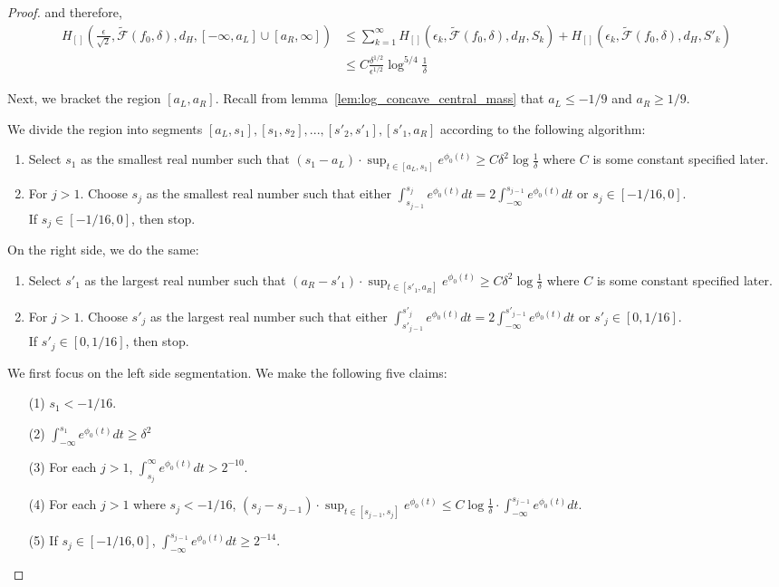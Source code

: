 \documentclass[12pt]{article}
\begin{document}
\begin{proof}
  
  and therefore,
  \begin{align}
    H_{[]}(\frac{\epsilon}{\sqrt{2}}, \tilde{\mathcal{F}}(f_0, \delta), d_H, [-\infty, a_L] \cup [a_R, \infty] )
    &\leq  \sum_{k=1}^\infty
    H_{[]}(\epsilon_k, \tilde{\mathcal{F}}(f_0, \delta), d_H, S_k) +
    H_{[]}(\epsilon_k, \tilde{\mathcal{F}}(f_0, \delta), d_H, S'_k) \\
    & \leq C \frac{\delta^{1/2}}{\epsilon^{1/2}} \log^{5/4} \frac{1}{\delta}
  \end{align}
    
  Next, we bracket the region $[a_L, a_R]$. Recall from lemma~\ref{lem:log_concave_central_mass} that $a_L \leq -1/9$ and $a_R \geq 1/9$. 

  We divide the region into segments $[a_L, s_1], [s_1, s_2], ..., [s'_2, s'_1], [s'_1, a_R]$ according to the following algorithm:
  \begin{enumerate}
  \item Select $s_1$ as the smallest real number such that $(s_1 - a_L) \cdot \sup_{t \in [a_L, s_1]} e^{\phi_0(t)}  \geq C \delta^2 \log \frac{1}{\delta}$ where $C$ is some constant specified later.
  \item For $j > 1$. Choose $s_j$ as the smallest real number such that either
    \subitem[a] $\int_{s_{j-1}}^{s_j} e^{\phi_0(t)} dt = 2\int_{-\infty}^{s_{j-1}} e^{\phi_0(t)}dt$ or
    \subitem[b] $s_j \in [-1/16, 0]$.\\
    If $s_j \in [-1/16, 0]$, then stop.
  \end{enumerate}

  On the right side, we do the same:
    \begin{enumerate}
  \item Select $s'_1$ as the largest real number such that $(a_R - s'_1) \cdot \sup_{t \in [s'_1, a_R]} e^{\phi_0(t)} \geq C \delta^2 \log \frac{1}{\delta}$ where $C$ is some constant specified later.
  \item For $j > 1$. Choose $s'_j$ as the largest real number such that either
    \subitem[a] $\int_{s'_{j-1}}^{s'_j} e^{\phi_0(t)} dt = 2\int_{-\infty}^{s'_{j-1}} e^{\phi_0(t)}dt$ or
    \subitem[b] $s'_j \in [0, 1/16]$.\\
    If $s'_j \in [0, 1/16]$, then stop.
  \end{enumerate}

  We first focus on the left side segmentation. We make the following five claims:
  \begin{enumerate}
  \item[(1)]  $s_1 < -1/16$.
  \item[(2)] $\int_{-\infty}^{s_1} e^{\phi_0(t)}dt \geq \delta^2$
  \item[(3)] For each $j > 1$, $\int_{s_j}^{\infty} e^{\phi_0(t)} dt > 2^{-10}$.
  \item[(4)] For each $j > 1$ where $s_j < -1/16$, $(s_j - s_{j-1}) \cdot \sup_{t \in [s_{j-1}, s_j]} e^{\phi_0(t)} \leq C \log \frac{1}{\delta} \cdot \int_{-\infty}^{s_{j-1}} e^{\phi_0(t)} dt$.
  \item[(5)] If $s_j \in [-1/16, 0]$, $\int_{-\infty}^{s_{j-1}} e^{\phi_0(t)} dt \geq 2^{-14}$. 
  \end{enumerate}
  

\end{proof}
\end{document}
